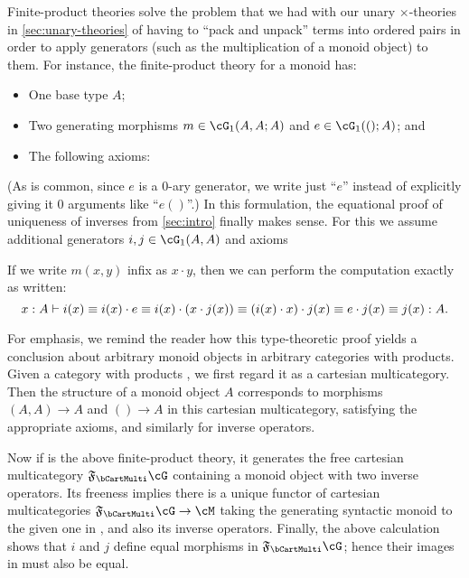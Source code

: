 Finite-product theories solve the problem that we had with our unary $\times$-theories in \cref{sec:unary-theories} of having to ``pack and unpack'' terms into ordered pairs in order to apply generators (such as the multiplication of a monoid object) to them.
For instance, the finite-product theory for a monoid has:
\begin{itemize}
\item One base type $A$;
\item Two generating morphisms $m\in\cG_1(A,A;A)$ and $e\in \cG_1(();A)$; and
\item The following axioms:
\end{itemize}
(As is common, since $e$ is a 0-ary generator, we write just ``$e$'' instead of explicitly giving it 0 arguments like ``$e()$''.)
In this formulation, the equational proof of uniqueness of inverses from \cref{sec:intro} finally makes sense.
For this we assume additional generators $i,j\in \cG_1(A,A)$ and axioms
If we write $m(x,y)$ infix as $x\cdot y$, then we can perform the computation exactly as written:
\[ x:A \vdash i(x) \equiv i(x) \cdot e \equiv i(x) \cdot (x \cdot j(x)) \equiv (i(x)\cdot x)\cdot j(x) \equiv e\cdot j(x) \equiv j(x) : A.\]

For emphasis, we remind the reader how this type-theoretic proof yields a conclusion about arbitrary monoid objects in arbitrary categories with products.
Given a category with products \cM, we first regard it as a cartesian multicategory.
Then the structure of a monoid object $A$ corresponds to morphisms $(A,A)\to A$ and $()\to A$ in this cartesian multicategory, satisfying the appropriate axioms, and similarly for inverse operators.

Now if \cG is the above finite-product theory, it generates the free cartesian multicategory $\F\bCartMulti\cG$ containing a monoid object with two inverse operators.
Its freeness implies there is a unique functor of cartesian multicategories $\F\bCartMulti\cG\to \cM$ taking the generating syntactic monoid to the given one in \cM, and also its inverse operators.
Finally, the above calculation shows that $i$ and $j$ define equal morphisms in $\F\bCartMulti\cG$; hence their images in \cM must also be equal.

